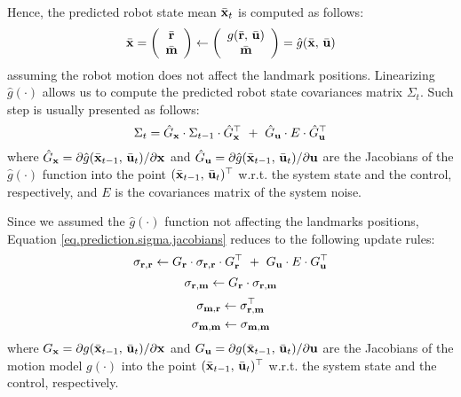 	Hence, the predicted robot state mean $\bar{\boldsymbol{\mathrm{{x}}}}_t$ is computed as follows:
	\begin{equation}
		\label{eq.prediction.mean.update}
		\bar{\boldsymbol{\mathrm{{x}}}} = 
		\left(\begin{array}{c}
			\bar{\boldsymbol{\mathrm{{r}}}} \\ \bar{\boldsymbol{\mathrm{{m}}}}
		\end{array}\right)
		\leftarrow
		\left(\begin{array}{c}
			g(\bar{\boldsymbol{\mathrm{{r}}}},\, \bar{\boldsymbol{\mathrm{{u}}}}) \\ \bar{\boldsymbol{\mathrm{{m}}}}
		\end{array}\right)
		= \hat{g}(\bar{\boldsymbol{\mathrm{{x}}}},\, \bar{\boldsymbol{\mathrm{{u}}}})
	\end{equation}
	assuming the robot motion does not affect the landmark positions.
	Linearizing $\hat{g}(\cdot)$ allows us to compute the predicted robot state covariances matrix $\Sigma_t$.
	Such step is usually presented as follows: %
	\begin{equation}
		\label{eq.prediction.sigma.jacobians}
		\Sigma_t = \hat{G}_{\boldsymbol{\mathrm{{x}}}} \cdot \Sigma_{t-1} \cdot \hat{G}^\top_{\boldsymbol{\mathrm{{x}}}} \ + \ \hat{G}_{\boldsymbol{\mathrm{{u}}}} \cdot E \cdot \hat{G}^\top_{\boldsymbol{\mathrm{{u}}}}
	\end{equation}
	where $\hat{G}_{\boldsymbol{\mathrm{{x}}}} = \partial \hat{g}(\bar{\boldsymbol{\mathrm{{x}}}}_{t-1},\, \bar{\boldsymbol{\mathrm{{u}}}}_{t}) / \partial \boldsymbol{\mathrm{{x}}}$ and $\hat{G}_{\boldsymbol{\mathrm{{u}}}} = \partial \hat{g}(\bar{\boldsymbol{\mathrm{{x}}}}_{t-1},\, \bar{\boldsymbol{\mathrm{{u}}}}_{t}) / \partial \boldsymbol{\mathrm{{u}}}$ are the Jacobians of the $\hat{g}(\cdot)$ function into the point $(\bar{\boldsymbol{\mathrm{{x}}}}_{t-1},\, \bar{\boldsymbol{\mathrm{{u}}}}_{t})^\top$ w.r.t. the system state and the control, respectively, and $E$ is the covariances matrix of the system noise. 
	
	Since we assumed the $\hat{g}(\cdot)$ function not affecting the landmarks positions, Equation \ref{eq.prediction.sigma.jacobians} reduces to the following update rules:
	\begin{equation}
		\label{eq.prediction.covs.update.rr}
		\sigma_{\boldsymbol{\mathrm{{r}}},\boldsymbol{\mathrm{{r}}}} \leftarrow G_{\boldsymbol{\mathrm{{r}}}} \cdot \sigma_{\boldsymbol{\mathrm{{r}}},\boldsymbol{\mathrm{{r}}}} \cdot G^\top_{\boldsymbol{\mathrm{{r}}}} \ + \ G_{\boldsymbol{\mathrm{{u}}}} \cdot E \cdot G^\top_{\boldsymbol{\mathrm{{u}}}}
	\end{equation}
	\begin{equation}
		\label{eq.prediction.covs.update.rm}
		\sigma_{\boldsymbol{\mathrm{{r}}},\boldsymbol{\mathrm{{m}}}} \leftarrow G_{\boldsymbol{\mathrm{{r}}}} \cdot \sigma_{\boldsymbol{\mathrm{{r}}},\boldsymbol{\mathrm{{m}}}}
	\end{equation}
	\begin{equation}
		\label{eq.prediction.covs.update.mr}
		\sigma_{\boldsymbol{\mathrm{{m}}},\boldsymbol{\mathrm{{r}}}} \leftarrow \sigma^\top_{\boldsymbol{\mathrm{{r}}},\boldsymbol{\mathrm{{m}}}}
	\end{equation}
	\begin{equation}
		\label{eq.prediction.covs.update.mm}
		\sigma_{\boldsymbol{\mathrm{{m}}},\boldsymbol{\mathrm{{m}}}} \leftarrow \sigma_{\boldsymbol{\mathrm{{m}}},\boldsymbol{\mathrm{{m}}}}
	\end{equation}
	where $G_{\boldsymbol{\mathrm{{x}}}} = \partial g(\bar{\boldsymbol{\mathrm{{x}}}}_{t-1},\, \bar{\boldsymbol{\mathrm{{u}}}}_{t}) / \partial \boldsymbol{\mathrm{{x}}}$ and $G_{\boldsymbol{\mathrm{{u}}}} = \partial g(\bar{\boldsymbol{\mathrm{{x}}}}_{t-1},\, \bar{\boldsymbol{\mathrm{{u}}}}_{t}) / \partial \boldsymbol{\mathrm{{u}}}$ are the Jacobians of the motion model $g(\cdot)$ into the point $(\bar{\boldsymbol{\mathrm{{x}}}}_{t-1},\, \bar{\boldsymbol{\mathrm{{u}}}}_{t})^\top$ w.r.t. the system state and the control, respectively.
	
